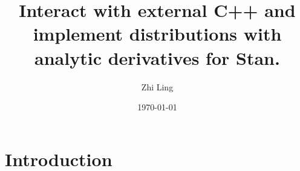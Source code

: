 \documentclass[11pt]{article}
\title{Interact with external C++ and implement distributions with analytic derivatives for Stan.}
\author{Zhi Ling}
\date{\today}
\begin{document}
\maketitle


\section{Introduction}
\begin{comment}
stan 的反向自动微分完全消除了导数的实现负担，但同时也成为了stan程序典型的性能瓶颈。为了直观地感受这种差异，以下是一个可运行的例子。

For example, one may typically have the code for negative binomial distribution

\begin{lstlisting}[language=Stan, style=lgeneral]
target += neg_binomial_2_lpmf(y | alpha, beta);
\end{lstlisting}

However, when the negative binomial distribution needs to be truncated, we may have
\begin{lstlisting}[language=Stan, style=lgeneral]
target += neg_binomial_2_lpmf(y | alpha, beta) T[0,k];
// or
target += neg_binomial_2_lpmf(y | alpha, beta) - neg_binomial_2_lcdf(k | alpha, beta);
// or in anywhere of the model you linked target and neg_binomial_2_lcdf/lccdf.
\end{lstlisting}

Therefore, it would be beneficial to promote statisticians and developers to work together to improve the Stan math library. The following facts were pointed out by \href{https://github.com/stan-dev/stan/wiki/Contributing-to-Stan-Without-C-Plus-Plus--Experience}{Stan's developer wiki}: the development of the Stan language is hindered not only by technical challenges but also by mathematical complexities, especially when adding new probability density functions. Ideally, each density function in Stan should have analytical specifications of its density, gradient, cumulative distribution function, and random number generation. This necessitates extensive research before coding. 


This has many benefits: 
\begin{enumerate}
	\item Significantly reduces reverse automatic differentiation (AD) overhead. Since Stan spends most of its time calculating the gradient of the log probability function\footnote{\href{https://mc-stan.org/docs/stan-users-guide/vectorization.html}{Stan user's guide}}, this therefore greatly reduces the runtime and memory overhead of Stan programs.
	\item C++ template metaprogramming feature avoids manually and repeatedly writing function overloads, achieving automatic input adaptation and vectorization.
	\item One can submit the newly written distribution to \href{https://mc-stan.org/users/interfaces/math}{Stan Math Library}, contributing to the open source community. So that everyone can benefit from it.
\end{enumerate}



\end{comment}
\end{document}
